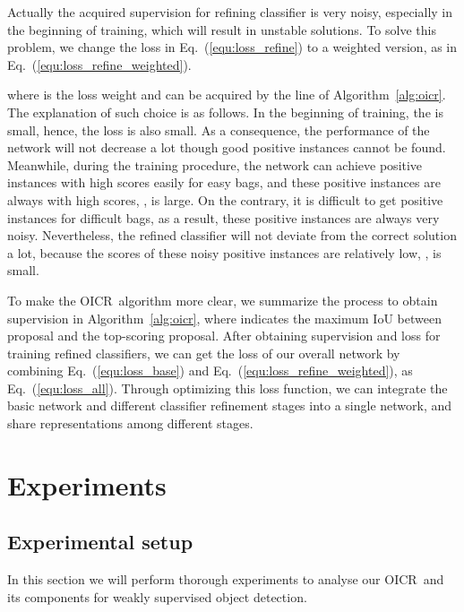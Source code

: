 \documentclass[10pt,twocolumn,letterpaper]{article}
\def\methodname{OICR}
\begin{document}
Actually the acquired supervision for refining classifier is very noisy, especially in the beginning of training, which will result in unstable solutions.
To solve this problem, we change the loss in Eq.~(\ref{equ:loss_refine}) to a weighted version, as in Eq.~(\ref{equ:loss_refine_weighted}).

where  is the loss weight and can be acquired by the  line of Algorithm~\ref{alg:oicr}.
The explanation of such choice is as follows.
In the beginning of training, the  is small, hence, the loss is also small.
As a consequence, the performance of the network will not decrease a lot though good positive instances cannot be found.
Meanwhile, during the training procedure, the network can achieve positive instances with high scores easily for easy bags, and these positive instances are always with high scores, \ie,  is large.
On the contrary, it is difficult to get positive instances for difficult bags, as a result, these positive instances are always very noisy.
Nevertheless, the refined classifier will not deviate from the correct solution a lot, because the scores of these noisy positive instances are relatively low, \ie,  is small.

To make the \methodname\ algorithm more clear, we summarize the process to obtain supervision in Algorithm~\ref{alg:oicr}, where  indicates the maximum IoU between proposal  and the top-scoring proposal.
After obtaining supervision and loss for training refined classifiers, we can get the loss of our overall network by combining Eq.~(\ref{equ:loss_base}) and Eq.~(\ref{equ:loss_refine_weighted}), as Eq.~(\ref{equ:loss_all}).
Through optimizing this loss function, we can integrate the basic network and different classifier refinement stages into a single network, and share representations among different stages.





\section{Experiments}
\label{sec:exp}

\subsection{Experimental setup}
\label{sec:exp_setup}

In this section we will perform thorough experiments to analyse our \methodname\ and its components for weakly supervised object detection.
\end{document}
